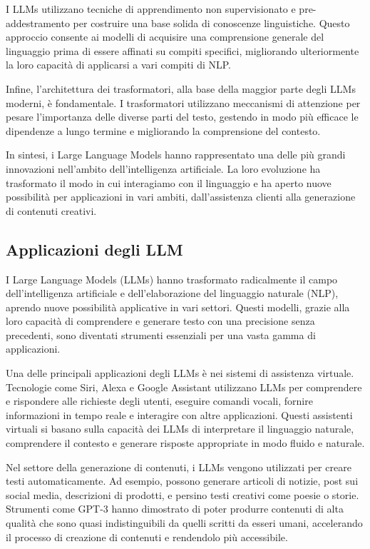 \documentclass[a4paper,twoside,12pt]{toptesi}
\begin{document}
I LLMs utilizzano tecniche di apprendimento non supervisionato e pre-addestramento per costruire una base solida di conoscenze linguistiche. Questo approccio consente ai modelli di acquisire una comprensione generale del linguaggio prima di essere affinati su compiti specifici, migliorando ulteriormente la loro capacità di applicarsi a vari compiti di NLP.

Infine, l'architettura dei trasformatori, alla base della maggior parte degli LLMs moderni, è fondamentale. I trasformatori utilizzano meccanismi di attenzione per pesare l'importanza delle diverse parti del testo, gestendo in modo più efficace le dipendenze a lungo termine e migliorando la comprensione del contesto.

In sintesi, i Large Language Models hanno rappresentato una delle più grandi innovazioni nell'ambito dell'intelligenza artificiale. La loro evoluzione ha trasformato il modo in cui interagiamo con il linguaggio e ha aperto nuove possibilità per applicazioni in vari ambiti, dall'assistenza clienti alla generazione di contenuti creativi.

\subsection{Applicazioni degli LLM}

I Large Language Models (LLMs) hanno trasformato radicalmente il campo dell'intelligenza artificiale e dell'elaborazione del linguaggio naturale (NLP), aprendo nuove possibilità applicative in vari settori. Questi modelli, grazie alla loro capacità di comprendere e generare testo con una precisione senza precedenti, sono diventati strumenti essenziali per una vasta gamma di applicazioni.

Una delle principali applicazioni degli LLMs è nei sistemi di assistenza virtuale. Tecnologie come Siri, Alexa e Google Assistant utilizzano LLMs per comprendere e rispondere alle richieste degli utenti, eseguire comandi vocali, fornire informazioni in tempo reale e interagire con altre applicazioni. Questi assistenti virtuali si basano sulla capacità dei LLMs di interpretare il linguaggio naturale, comprendere il contesto e generare risposte appropriate in modo fluido e naturale.

Nel settore della generazione di contenuti, i LLMs vengono utilizzati per creare testi automaticamente. Ad esempio, possono generare articoli di notizie, post sui social media, descrizioni di prodotti, e persino testi creativi come poesie o storie. Strumenti come GPT-3 hanno dimostrato di poter produrre contenuti di alta qualità che sono quasi indistinguibili da quelli scritti da esseri umani, accelerando il processo di creazione di contenuti e rendendolo più accessibile.
\end{document}
